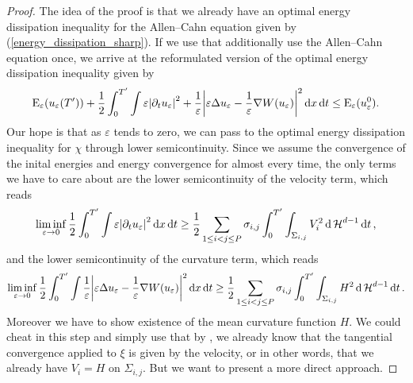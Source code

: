 \begin{proof}
	The idea of the proof is that we already have an optimal energy dissipation 
	inequality for the Allen--Cahn equation given by 
	(\ref{energy_dissipation_sharp}).
	If we use that additionally use the Allen--Cahn equation once, we arrive at 
	the reformulated version of the optimal energy dissipation inequality given 
	by
	\begin{equation*}
	\label{energy_dissipation_sharp_with_curvature}
	\operatorname{E}_{ \varepsilon } ( u_{ \varepsilon } ( T' ) )
	+
	\frac{ 1 }{ 2 }
	\int_{ 0 }^{ T' }
		\int
			\varepsilon \abs{ \partial_{ t } u_{ \varepsilon } }^{ 2 }
			+
			\frac{ 1 }{ \varepsilon }
			\abs{
				\varepsilon \Delta u_{ \varepsilon } 
				-
				\frac{ 1 }{ \varepsilon } \nabla W ( u_{ \varepsilon } )
			}^{ 2 }
		\dd{ x }
	\dd{ t }
	\leq
	\operatorname{E}_{ \varepsilon } ( u_{ \varepsilon}^{ 0 } ).
	\end{equation*}
	Our hope is that as $ \varepsilon $ tends to zero, we can pass to the 
	optimal energy dissipation inequality for $ \chi $ through lower 
	semicontinuity. 
	Since we assume the convergence of the inital energies and energy 
	convergence for almost every time, the only terms we have to care about are 
	the lower semicontinuity of the velocity term, which reads
	\begin{equation}
		\label{lsc_of_velocity}
		\liminf_{ \varepsilon \to 0 }
			\frac{ 1 }{ 2 }
			\int_{ 0 }^{ T' }
				\int
					\varepsilon 
					\abs{ \partial_{ t } u_{ \varepsilon } }^{ 2 }
				\dd{ x }
			\dd{ t }
		\geq
		\frac{ 1 }{ 2 }
		\sum_{ 1 \leq i < j \leq P }
			\sigma_{ i , j }
			\int_{ 0 }^{ T' }
				\int_{ \Sigma_{ i , j } }
					V_{ i }^{ 2 }
				\dd{ \operatorname{\mathcal{H}}^{ d - 1 } }
			\dd{ t },
	\end{equation}
	and the lower semicontinuity of the curvature term, which reads
	\begin{equation}
		\label{lsc_of_curvature}
		\liminf_{ \varepsilon \to 0 }
			\frac{ 1 }{ 2 }
			\int_{ 0 }^{ T' }
				\int
					\frac{ 1 }{ \varepsilon }
					\abs{
						\varepsilon
						\Delta u_{ \varepsilon }
						-
						\frac{ 1 }{ \varepsilon }
						\nabla W ( u_{ \varepsilon } ) 
					}^{ 2 }
				\dd{ x }
			\dd{ t }
		\geq
		\frac{ 1 }{ 2 }
		\sum_{ 1 \leq i < j \leq P }
			\sigma_{ i , j }
			\int_{ 0 }^{ T' }
				\int_{ \Sigma_{ i , j } }
					H^{ 2 }
				\dd{ \operatorname{\mathcal{H}}^{ d - 1 } }
			\dd{ t }.
	\end{equation}
	Moreover we have to show existence of the mean curvature function $ H $.
	We could cheat in this step and simply use that by 
	, we already know that the tangential 
	convergence applied to $ \xi $ is given by the velocity, or in other words, 
	that we already have $ V_{ i } = H $ on $ \Sigma_{ i , j } $. But we want 
	to present a more direct approach.
	

\end{proof}
